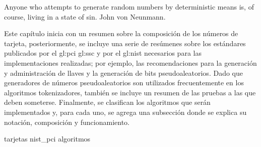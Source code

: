 %
%
%

\label{sec:generacion_de_tokens}
{%
  Anyone who attempts to generate random numbers by deterministic means is, of
  course, living in a state of sin.%
}
{%
   John von Neunmann.%
}

\noindent
Este capítulo inicia con un resumen sobre la composición de los números de
tarjeta, posteriormente, se incluye una serie de resúmenes sobre los estándares
publicados por el \gls{gl:pci} \gls{gl:ssc} y por el \gls{gl:nist} necesarios
para las implementaciones realizadas; por ejemplo, las recomendaciones para la
generación y administración de llaves y la generación de bits pseudoaleatorios.
Dado que generadores de números pseudoaleatorios son utilizados frecuentemente
en los algoritmos tokenizadores, también se incluye un resumen de las pruebas a
las que deben someterse. Finalmente, se clasifican los algoritmos que serán
implementados y, para cada uno, se agrega una subsección donde se explica su
notación, composición y funcionamiento.

{tarjetas}
{nist_pci}
{algoritmos}
